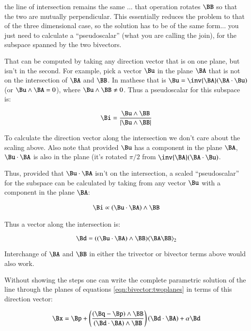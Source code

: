 the line of intersection remains the same ... that operation rotates $\BB$ so that the two are mutually perpendicular.  This essentially reduces the problem to that of the three dimensional case, so the solution has to be of the same form... you just need to calculate a ``pseudoscalar'' (what you are calling the join), for the subspace spanned by the two bivectors.

That can be computed by taking any direction vector that is on one plane, but isn't in the second.  For example, pick a vector $\Bu$ in the plane $\BA$ that is not on the intersection of $\BA$ and $\BB$.  In mathese that is $\Bu = \inv{\BA}(\BA\cdot \Bu)$ (or $\Bu \wedge \BA = 0$), where $\Bu \wedge \BB \ne 0$.  Thus a pseudoscalar for this subspace is:

\begin{align*}
\Bi = \frac{\Bu \wedge \BB}{\Abs{\Bu \wedge \BB}}
\end{align*}

To calculate the direction vector along the intersection we don't care about the scaling above.  Also note that provided $\Bu$ has a component in the plane $\BA$, $\Bu \cdot \BA$ is also in the plane (it's rotated $\pi/2$ from $\inv{\BA}(\BA \cdot \Bu)$.

Thus, provided that $\Bu \cdot \BA$ isn't on the intersection, a scaled ``pseudoscalar''
for the subspace can be calculated by taking from any vector $\Bu$ with a component in the plane $\BA$:

\begin{align*}
\Bi \propto (\Bu \cdot \BA) \wedge \BB
\end{align*}

Thus a vector along the intersection is:

\begin{equation}\label{eqn:bivector:pseudoscalarinter}
\Bd = ((\Bu \cdot \BA) \wedge \BB) \gpgradetwo{\BA\BB}
\end{equation}

Interchange of $\BA$ and $\BB$ in either the trivector or bivector terms above would also work.

Without showing the steps one can write the complete parametric solution of the line through the planes of equations \ref{eqn:bivector:twoplanes} in terms of this direction vector:

\begin{equation}\label{eqn:bivector:finalsolnofRNplaneintersection}
\Bx = \Bp + \left(\frac{(\Bq - \Bp)\wedge \BB}{(\Bd \cdot \BA) \wedge \BB}\right) (\Bd \cdot \BA) + \alpha \Bd
\end{equation}

